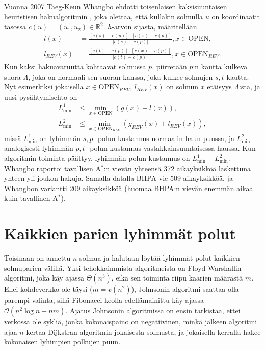 \documentclass[finnish]{tktltiki2}
\theoremstyle{definition}
\theoremstyle{remark}
\begin{document}
Vuonna 2007 Taeg-Keun Whangbo ehdotti toisenlaisen kaksisuuntaisen heuristisen hakualgoritmin \cite{Whangbo07}, joka olettaa, että kullakin solmulla $u$ on koordinaatit tasossa $c(u) = (u_1, u_2) \in \mathbb{R}^2$. $h$-arvon sijasta, määritellään
\begin{align*}
l(x) &= \frac{[c(s) - c(p)] \cdot [c(x) - c(p)]}{ | c(s) - c(p) | }, x \in \text{OPEN}, \\
l_{REV}(x) &= \frac{[c(t) - c(p)] \cdot [c(x) - c(p)]}{ | c(t) - c(p) | }, x \in \text{OPEN}_{REV}.
\end{align*}
Kun kaksi hakuavaruutta kohtaavat solmussa $p$, piirretään $p$:n kautta kulkeva suora $\Lambda$, joka on normaali sen suoran kanssa, joka kulkee solmujen $s, t$ kautta. Nyt esimerkiksi jokaisella $x \in \text{OPEN}_{REV}$, $l_{REV}(x)$ on solmun $x$ etäisyys $\Lambda$:sta, ja uusi pysähtymisehto on
\begin{align*}
L^1_{\min} & \leq \underset{x \in \text{OPEN}}{\min} (g(x) + l(x)), \\
L^2_{\min} & \leq \underset{x \in \text{OPEN}_{REV}}{\min} (g_{REV}(x) + l_{REV}(x)),
\end{align*}
missä $L_{\min}^1$ on lyhimmän $s, p$ -polun kustannus normaalin haun puussa, ja $L_{\min}^2$ analogisesti lyhimmän $p, t$ -polun kustannus vastakkainsuuntaisessa haussa. Kun algoritmin toiminta päättyy, lyhimmän polun kustannus on $L^1_{\min} + L^2_{\min}$. Whangbo raportoi tavallisen A$^{\ast}$:n vievän yhteensä 372 aikayksikköä laskettuna yhteen yli joukon hakuja. Samalla datalla BHPA vie 509 aikayksikköä, ja Whangbon variantti 209 aikayksikköä (huomaa BHPA:n vievän enemmän aikaa kuin tavallinen A$^{\ast}$).

\section{Kaikkien parien lyhimmät polut}
Toisinaan on annettu $n$ solmua ja halutaan löytää lyhimmät polut kaikkien solmuparien välillä. Yksi tehokkaimmista algoritmeista on Floyd-Warshallin algoritmi, joka käy ajassa $\Theta(n^3)$, eikä sen toiminta riipu kaarien määrästä $m$. Ellei kohdeverkko ole täysi ($m = \mathcal{o}(n^2)$), Johnsonin algoritmi saattaa olla parempi valinta, sillä Fibonacci-keolla edellämainittu käy ajassa $\mathcal{O}(n^2 \log n + nm)$. Ajatus Johnsonin algoritmissa on ensin tarkistaa, ettei verkossa ole sykliä, jonka kokonaispaino on negatiivinen, minkä jälkeen algoritmi ajaa $n$ kertaa Dijkstran algoritmin jokaisesta solmusta, ja jokaisella kerralla hakee kokonaisen lyhimpien polkujen puun. 
\end{document}
